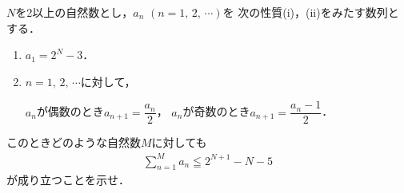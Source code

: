 \documentclass[../../main.tex]{subfiles}
\begin{document}
$N$を2以上の自然数とし，$a_n$ $(n=1, \, 2, \, \cdots)$を
次の性質(i)，(ii)をみたす数列とする．
\begin{enumerate}
  \item[(i)] $a_1=2^N-3$．
  \item[(ii)] $n=1, \, 2, \, \cdots$に対して，

    $a_n$が偶数のとき$\displaystyle a_{n+1}=\dfrac{a_n}{2}$，
    $a_n$が奇数のとき$\displaystyle a_{n+1}=\dfrac{a_n-1}{2}$．
\end{enumerate}
このときどのような自然数$M$に対しても
\begin{align*}
  \sum_{n=1}^Ma_n \leqq 2^{N+1}-N-5
\end{align*}
が成り立つことを示せ．
\end{document}

